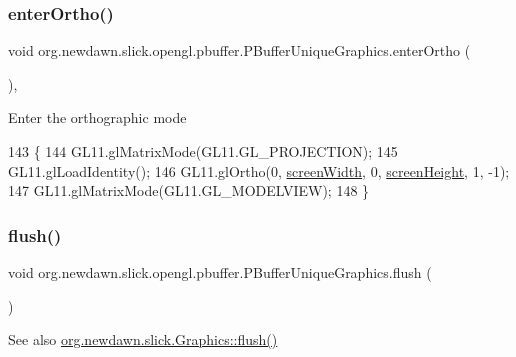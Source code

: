 \subsubsection{\texorpdfstring{enter\+Ortho()}{enterOrtho()}}
{\footnotesize\ttfamily void org.\+newdawn.\+slick.\+opengl.\+pbuffer.\+P\+Buffer\+Unique\+Graphics.\+enter\+Ortho (\begin{DoxyParamCaption}{ }\end{DoxyParamCaption})\hspace{0.3cm}{\ttfamily [inline]}, {\ttfamily [protected]}}

Enter the orthographic mode 
\begin{DoxyCode}
143                                 \{
144         GL11.glMatrixMode(GL11.GL\_PROJECTION);
145         GL11.glLoadIdentity();
146         GL11.glOrtho(0, \mbox{\hyperlink{classorg_1_1newdawn_1_1slick_1_1_graphics_adbb4b10050a8bcf8e496130509784f71}{screenWidth}}, 0, \mbox{\hyperlink{classorg_1_1newdawn_1_1slick_1_1_graphics_a24cd14275ad2dcd82fcd843ceab6a80b}{screenHeight}}, 1, -1);
147         GL11.glMatrixMode(GL11.GL\_MODELVIEW);
148     \}
\end{DoxyCode}
\mbox{\label{classorg_1_1newdawn_1_1slick_1_1opengl_1_1pbuffer_1_1_p_buffer_unique_graphics_a82f5d8389d4081ddb925051ec6ff68ad}} 
\subsubsection{\texorpdfstring{flush()}{flush()}}
{\footnotesize\ttfamily void org.\+newdawn.\+slick.\+opengl.\+pbuffer.\+P\+Buffer\+Unique\+Graphics.\+flush (\begin{DoxyParamCaption}{ }\end{DoxyParamCaption})\hspace{0.3cm}{\ttfamily [inline]}}

\begin{DoxySeeAlso}{See also}
\mbox{\hyperlink{classorg_1_1newdawn_1_1slick_1_1_graphics_aef2136ee874864cef4886ad15485b79f}{org.\+newdawn.\+slick.\+Graphics\+::flush()}} 
\end{DoxySeeAlso}


